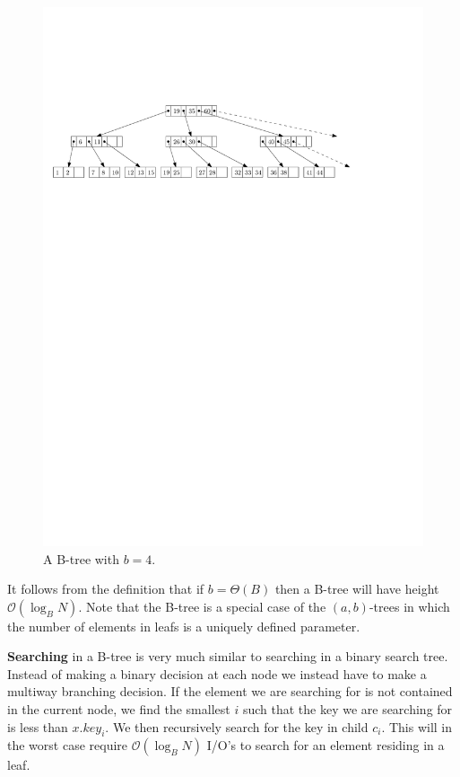 \documentclass[twoside,11pt,openright]{report}
\begin{document}
\begin{figure}[h]
	\centering
	\includegraphics[width=\textwidth]{../figures/b-tree}
	\caption{A B-tree with $b = 4$.}
	\label{fig:b-tree}
\end{figure}

It follows from the definition that if $b=\Theta(B)$ then a B-tree will have height $\mathcal{O}(\log_B N)$. Note that the B-tree is a special case of the $(a,b)$-trees in which the number of elements in leafs is a uniquely defined parameter.

\textbf{Searching} in a B-tree is very much similar to searching in a binary search tree. Instead of making a binary decision at each node we instead have to make a multiway branching decision. If the element we are searching for is not contained in the current node, we find the smallest $i$ such that the key we are searching for is less than $x.key_i$. We then recursively search for the key in child $c_i$. This will in the worst case require $\mathcal{O}(\log_B N)$ I/O's to search for an element residing in a leaf.
\end{document}
